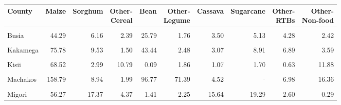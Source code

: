 \begin{table}[!h]
\centering
\begin{tabular}{lrrrrrrrrr}
\toprule
County & Maize & Sorghum & \makecell{Other-\\Cereal} & Bean & \makecell{Other-\\Legume} & Cassava & Sugarcane & \makecell{Other-\\RTBs} & \makecell{Other-\\Non-food}\\
\midrule
\cellcolor{gray!10}{Bungoma} & \cellcolor{gray!10}{91.63} & \cellcolor{gray!10}{11.74} & \cellcolor{gray!10}{2.46} & \cellcolor{gray!10}{57.88} & \cellcolor{gray!10}{2.17} & \cellcolor{gray!10}{2.91} & \cellcolor{gray!10}{7.87} & \cellcolor{gray!10}{8.79} & \cellcolor{gray!10}{8.25}\\
Busia & 44.29 & 6.16 & 2.39 & 25.79 & 1.76 & 3.50 & 5.13 & 4.28 & 2.42\\
\cellcolor{gray!10}{Homa Bay} & \cellcolor{gray!10}{70.27} & \cellcolor{gray!10}{25.39} & \cellcolor{gray!10}{3.15} & \cellcolor{gray!10}{0.46} & \cellcolor{gray!10}{9.63} & \cellcolor{gray!10}{5.94} & \cellcolor{gray!10}{5.10} & \cellcolor{gray!10}{0.17} & \cellcolor{gray!10}{5.32}\\
Kakamega & 75.78 & 9.53 & 1.50 & 43.44 & 2.48 & 3.07 & 8.91 & 6.89 & 3.59\\
\cellcolor{gray!10}{Kiambu} & \cellcolor{gray!10}{41.28} & \cellcolor{gray!10}{0.09} & \cellcolor{gray!10}{0.47} & \cellcolor{gray!10}{30.46} & \cellcolor{gray!10}{0.92} & \cellcolor{gray!10}{0.13} & \cellcolor{gray!10}{-} & \cellcolor{gray!10}{21.24} & \cellcolor{gray!10}{31.11}\\
\addlinespace
Kisii & 68.52 & 2.99 & 10.79 & 0.09 & 1.86 & 1.07 & 1.70 & 0.63 & 11.88\\
\cellcolor{gray!10}{Kitui} & \cellcolor{gray!10}{116.53} & \cellcolor{gray!10}{30.68} & \cellcolor{gray!10}{30.68} & \cellcolor{gray!10}{69.77} & \cellcolor{gray!10}{97.76} & \cellcolor{gray!10}{1.70} & \cellcolor{gray!10}{-} & \cellcolor{gray!10}{0.78} & \cellcolor{gray!10}{5.08}\\
Machakos & 158.79 & 8.94 & 1.99 & 96.77 & 71.39 & 4.52 & - & 6.98 & 16.36\\
\cellcolor{gray!10}{Makueni} & \cellcolor{gray!10}{107.91} & \cellcolor{gray!10}{8.16} & \cellcolor{gray!10}{2.99} & \cellcolor{gray!10}{56.32} & \cellcolor{gray!10}{64.68} & \cellcolor{gray!10}{0.55} & \cellcolor{gray!10}{-} & \cellcolor{gray!10}{1.08} & \cellcolor{gray!10}{11.84}\\
Migori & 56.27 & 17.37 & 4.37 & 1.41 & 2.25 & 15.64 & 19.29 & 2.60 & 0.29\\
\bottomrule
\end{tabular}
\end{table}
